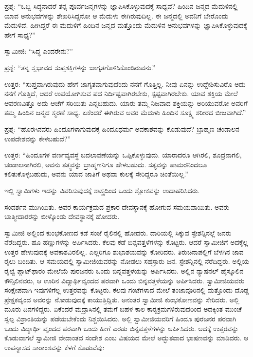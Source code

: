  ಪ್ರಶ್ನೆ: “ಒಬ್ಬ ಸಿದ್ಧನಾದರೆ ತನ್ನ ಪೂರ್ವಜನ್ಮಗಳನ್ನು ಜ್ಞಾಪಿಸಿಕೊಳ್ಳುವುದಕ್ಕೆ ಸಾಧ್ಯವೆ? ಹಿಂದಿನ ಜನ್ಮದ ಮೆದುಳಿನಲ್ಲಿ ಯಾವ ಅನುಭವಗಳನ್ನು ಶೇಖರಿಸಿದ್ದನೋ ಆ ಮೆದುಳು ಈಗಿರುವುದಿಲ್ಲ. ಈ ಜನ್ಮದಲ್ಲಿ ಅವನಿಗೆ ಬೇರೊಂದು ಮೆದುಳಿದೆ. ಹೀಗಿದ್ದರೆ ಈ ಮೆದುಳಿಗೆ ಹಿಂದಿನ ಜನ್ಮದ ಮತ್ತೊಂದು ಮೆದುಳಿನ ಅನುಭವಗಳನ್ನು ಜ್ಞಾಪಿಸಿಕೊಳ್ಳುವುದಕ್ಕೆ ಹೇಗೆ ಸಾಧ್ಯ?” 

 ಸ್ವಾಮೀಜಿ: “ಸಿದ್ಧ ಎಂದರೇನು?” 

 ಪ್ರಶ್ನೆ: “ತನ್ನ ಸ್ವಭಾವದ ಸುಪ್ತಶಕ್ತಿಗಳನ್ನು ಜಾಗೃತಗೊಳಿಸಿಕೊಂಡಿರುವನು.” 

 ಉತ್ತರ: “ಸುಪ್ತವಾಗಿರುವುದು ಹೇಗೆ ಜಾಗೃತವಾಗುವುದೆಂದು ನನಗೆ ಗೊತ್ತಿಲ್ಲ. ನೀವು ಏನನ್ನು ಉದ್ದೇಶಿಸುವಿರೊ ಅದು ನನಗೆ ಗೊತ್ತಿದೆ, ಆದರೆ ಉಪಯೋಗಿಸುವ ಪದ ನಿರ್ದಿಷ್ಟವಾಗಿರಬೇಕು, ಸ್ಪಷ್ಟವಾಗಿರಬೇಕು. ಯಾವ ಶಕ್ತಿಯ ಮೇಲೆ ಆವರಣವಿತ್ತೊ ಅದು ಆಚೆಗೆ ಸರಿಯಿತು ಎನ್ನಬಹುದು. ಯಾರು ತಮ್ಮ ನಿಜವಾದ ಶಕ್ತಿಯನ್ನು ಅರಿಯುವರೋ ಅವರಿಗೆ ತಮ್ಮ ಹಿಂದಿನ ಜನ್ಮದ ಸ್ಮರಣೆ ಸಾಧ್ಯ. ಏಕೆಂದರೆ ಈಗಿರುವ ಅವರ ಮೆದುಳು ಹಿಂದಿನ ಸೂಕ್ಷ್ಮ ಶರೀರದ ಬೀಜವಾಗಿದೆ.” 

 ಪ್ರಶ್ನೆ: “ಹೊರಗಿನವರು ಹಿಂದೂಗಳಾಗುವುದಕ್ಕೆ ಹಿಂದೂಧರ್ಮ ಅವಕಾಶವನ್ನು ಕೊಡುವುದೆ? ಬ್ರಾಹ್ಮಣ ಚಂಡಾಲನ ಉಪದೇಶವನ್ನು ಕೇಳಬಹುದೆ?” 

 ಉತ್ತರ: “ಹಿಂದೂಗಳ ವರ್ಣವ್ಯವಸ್ಥೆ ಬದಲಾವಣೆಯನ್ನು ಒಪ್ಪಿಕೊಳ್ಳುವುದು. ಯಾರಾದರೂ ಆಗಿರಲಿ, ಶೂದ್ರನಾಗಲಿ, ಚಂಡಾಲನಾಗಿರಲಿ, ಅವನು ತತ್ತ್ವವನ್ನು ಬ್ರಾಹ್ಮಣನಿಗೂ ಹೇಳಬಹುದು. ಸತ್ಯವನ್ನು ಪಾಮರನಿಂದಲೂ ಕಲಿತುಕೊಳ್ಳಬಹುದು, ಅವನು ಯಾವ ಜಾತಿಗೆ ಅಥವಾ ಕುಲಕ್ಕೆ ಸೇರಿದ್ದರೂ ಚಿಂತೆಯಿಲ್ಲ.” 

 ಇಲ್ಲಿ ಸ್ವಾಮಿಗಳು ಇದನ್ನು ವಿವರಿಸುವುದಕ್ಕೆ ಶಾಸ್ತ್ರದಿಂದ ಒಂದು ಶ್ಲೋಕವನ್ನು ಉದಾಹರಿಸಿದರು. 

 ಸಂದರ್ಶನ ಮುಗಿಯಿತು. ಅವರ ಕಾರ್ಯಕ್ರಮದ ಪ್ರಕಾರ ದೇವಸ್ಥಾನಕ್ಕೆ ಹೋಗುವ ಸಮಯವಾಯಿತು. ಅವರು ಬಾತ್ಮೀದಾರರನ್ನು ಬೀಳ್ಕೊಂಡು ದೇವಸ್ಥಾನಕ್ಕೆ ಹೋದರು. 

 ಸ್ವಾಮೀಜಿ ಅಲ್ಲಿಂದ ಕುಂಭಕೋಣದ ಕಡೆ ಸಂಜೆ ರೈಲಿನಲ್ಲಿ ಹೋದರು. ದಾರಿಯಲ್ಲಿ ಸಿಕ್ಕುವ ಸ್ಟೇಶನ್ನಿನಲ್ಲೆ ಜನರು ನೆರೆದಿದ್ದರು. ಹೂ ಹಣ್ಣುಗಳನ್ನು ಅರ್ಪಿಸಿದರು. ಕೆಲವು ಕಡೆ ಬಿನ್ನವತ್ತಳೆಗಳನ್ನು ಕೊಟ್ಟರು. ಆದರೆ ಸ್ವಾಮೀಜಿಗೆ ಅದಕ್ಕೆಲ್ಲ ಉತ್ತರ ಹೇಳುವುದಕ್ಕೆ ಅವಕಾಶವಿರಲಿಲ್ಲ. ಎಲ್ಲರಿಗೂ ಶುಭಾಶಯವನ್ನು ಕೋರಿದರು. ತಿರುಚಿನಾಪಲ್ಲಿಗೆ ಬೆಳಗಿನ ಜಾವ ರೈಲು ಬಂದಿತು. ಆ ಸಮಯದಲ್ಲಿ ಸ್ವಾಮೀಜಿಯವರನ್ನು ನೋಡಲು ಸಹಸ್ರಾರು ಜನ. ಸ್ಟೇಶನ್ನಿನಲ್ಲಿ ನೆರೆದಿದ್ದರು. ಅಲ್ಲಿಯ ರೈಲ್ವೆ ಪ್ಲಾಟ್‌ಫಾರಂ ಮೇಲೆಯೆ ಪುರಜನರು ಒಂದು ಬಿನ್ನವತ್ತಳೆಯನ್ನು ಅರ್ಪಿಸಿದರು. ಅಲ್ಲಿನ ನ್ಯಾಷನಲ್ ಹೈಸ್ಕೂಲಿನ ಕೌನ್ಸಿಲಿನವರು, ಆ ಊರಿನ ವಿದ್ಯಾರ್ಥಿವೃಂದದ ಪರವಾಗಿ ಒಂದು ಬಿನ್ನವತ್ತಳೆಯನ್ನು ಅರ್ಪಿಸಿದರು. ಸ್ವಾಮೀಜಿಯವರು ಸಂಕ್ಷೇಪವಾಗಿ ಇವುಗಳಿಗೆಲ್ಲ ಉತ್ತರವನ್ನು ಕೊಟ್ಟರು. ಕೆಲವು ಗಂಟೆಗಳಾದ ಮೇಲೆ ತಂಜಾವೂರಿನಲ್ಲಿ ಮತ್ತೊಂದು ದೊಡ್ಡ ಪ್ರೇಕ್ಷಕವೃಂದ ಅವರನ್ನು ನೋಡುವುದಕ್ಕೆ ಕಾಯುತ್ತಿದ್ದಿತು. ಅನಂತರ ಸ್ವಾಮೀಜಿ ಕುಂಭಕೋಣವನ್ನು ಸೇರಿದರು. ಅಲ್ಲಿ ಮೂರು ದಿನಗಳಿದ್ದರು. ಏಕೆಂದರೆ ಮದ್ರಾಸಿನಲ್ಲಿ ತಮಗೆ ಬಹಳ ಕಾಲ ಕಾರ‍್ಯಕ್ರಮಗಳಿರುವುದರಿಂದ ಅದಕ್ಕಿಂತ ಮುಂಚೆ ಸ್ವಲ್ಪ ವಿಶ್ರಾಂತಿಯನ್ನು ಪಡೆಯಬೇಕೆಂದು ನಿಶ್ಚಯಿಸಿದರು. ಅಲ್ಲಿ ಸ್ವಾಮೀಜಿಯವರಿಗೆ ಹಿಂದೂ ಪುರಜನರ ಪರವಾಗಿ ಒಂದು ವಿದ್ಯಾರ್ಥಿ ವೃಂದದ ಪರವಾಗಿ ಒಂದು ಹೀಗೆ ಎರಡು ಬಿನ್ನವತ್ತಳೆಗಳನ್ನು ಅರ್ಪಿಸಿದರು. ಅದಕ್ಕೆ ಉತ್ತರವನ್ನು ಕೊಡುವಾಗಲೆ ಸ್ವಾಮೀಜಿ ವೇದಾಂತದ ಸಂದೇಶ ಎಂಬ ವಿಷಯದ ಮೇಲೆ ಅದ್ಭುತವಾದ ಭಾಷಣವನ್ನು ಮಾಡಿದರು. ಆ ಉಪನ್ಯಾಸದ ಸಾರಾಂಶವನ್ನು ಕೆಳಗೆ ಕೊಡುವೆವು: 

